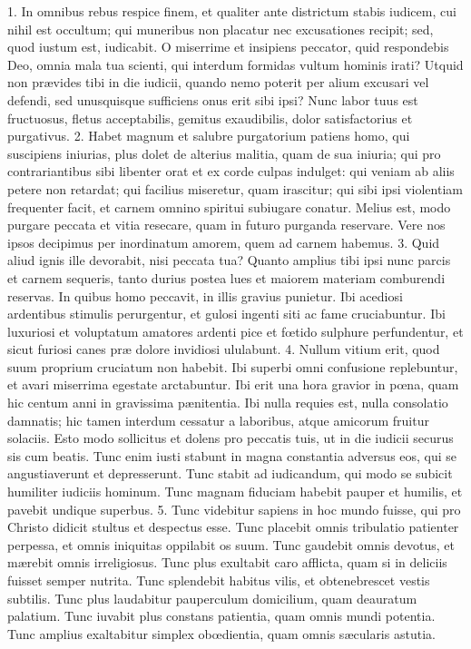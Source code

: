 1. In omnibus rebus respice finem, et qualiter ante districtum stabis iudicem, cui nihil est occultum; qui muneribus non placatur nec excusationes recipit; sed, quod iustum est, iudicabit. O miserrime et insipiens peccator, quid respondebis Deo, omnia mala tua scienti, qui interdum formidas vultum hominis irati? Utquid non prævides tibi in die iudicii, quando nemo poterit per alium excusari vel defendi, sed unusquisque sufficiens onus erit sibi ipsi? Nunc labor tuus est fructuosus, fletus acceptabilis, gemitus exaudibilis, dolor satisfactorius et purgativus.
2. Habet magnum et salubre purgatorium patiens homo, qui suscipiens iniurias, plus dolet de alterius malitia, quam de sua iniuria; qui pro contrariantibus sibi libenter orat et ex corde culpas indulget: qui veniam ab aliis petere non retardat; qui facilius miseretur, quam irascitur; qui sibi ipsi violentiam frequenter facit, et carnem omnino spiritui subiugare conatur. Melius est, modo purgare peccata et vitia resecare, quam in futuro purganda reservare. Vere nos ipsos decipimus per inordinatum amorem, quem ad carnem habemus.
3. Quid aliud ignis ille devorabit, nisi peccata tua? Quanto amplius tibi ipsi nunc parcis et carnem sequeris, tanto durius postea lues et maiorem materiam comburendi reservas. In quibus homo peccavit, in illis gravius punietur. Ibi acediosi ardentibus stimulis perurgentur, et gulosi ingenti siti ac fame cruciabuntur. Ibi luxuriosi et voluptatum amatores ardenti pice et fœtido sulphure perfundentur, et sicut furiosi canes præ dolore invidiosi ululabunt.
4. Nullum vitium erit, quod suum proprium cruciatum non habebit. Ibi superbi omni confusione replebuntur, et avari miserrima egestate arctabuntur. Ibi erit una hora gravior in pœna, quam hic centum anni in gravissima pænitentia. Ibi nulla requies est, nulla consolatio damnatis; hic tamen interdum cessatur a laboribus, atque amicorum fruitur solaciis. Esto modo sollicitus et dolens pro peccatis tuis, ut in die iudicii securus sis cum beatis. Tunc enim iusti stabunt in magna constantia adversus eos, qui se angustiaverunt et depresserunt. Tunc stabit ad iudicandum, qui modo se subicit humiliter iudiciis hominum. Tunc magnam fiduciam habebit pauper et humilis, et pavebit undique superbus.
5. Tunc videbitur sapiens in hoc mundo fuisse, qui pro Christo didicit stultus et despectus esse. Tunc placebit omnis tribulatio patienter perpessa, et omnis iniquitas oppilabit os suum. Tunc gaudebit omnis devotus, et mærebit omnis irreligiosus. Tunc plus exultabit caro afflicta, quam si in deliciis fuisset semper nutrita. Tunc splendebit habitus vilis, et obtenebrescet vestis subtilis. Tunc plus laudabitur pauperculum domicilium, quam deauratum palatium. Tunc iuvabit plus constans patientia, quam omnis mundi potentia. Tunc amplius exaltabitur simplex obœdientia, quam omnis sæcularis astutia.
